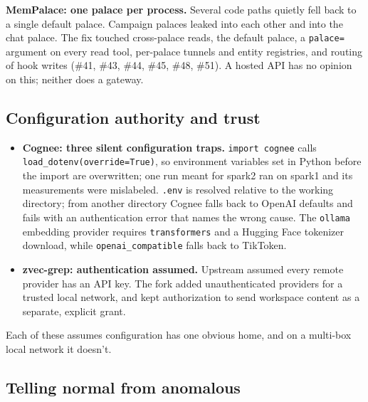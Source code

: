 \documentclass[11pt]{article}
\newcommand{\code}[1]{\texttt{#1}}
\begin{document}
\textbf{MemPalace: one palace per process.} Several code paths quietly fell back to a single default
palace. Campaign palaces leaked into each other and into the chat palace. The fix touched
cross-palace reads, the default palace, a \code{palace=} argument on every read tool, per-palace
tunnels and entity registries, and routing of hook writes (\#41, \#43, \#44, \#45, \#48, \#51). A
hosted API has no opinion on this; neither does a gateway.

\subsection{Configuration authority and trust}

\begin{itemize}
  \item \textbf{Cognee: three silent configuration traps.} \code{import cognee} calls
    \code{load\_dotenv(\allowbreak override=True)}, so environment variables set in Python before the import are
    overwritten; one run meant for spark2 ran on spark1 and its measurements were mislabeled.
    \code{.env} is resolved relative to the working directory; from another directory Cognee falls
    back to OpenAI defaults and fails with an authentication error that names the wrong cause. The
    \code{ollama} embedding provider requires \code{transformers} and a Hugging Face tokenizer
    download, while \code{openai\_compatible} falls back to TikToken.
  \item \textbf{zvec-grep: authentication assumed.} Upstream assumed every remote provider has an API
    key. The fork added unauthenticated providers for a trusted local network, and kept
    authorization to send workspace content as a separate, explicit grant.
\end{itemize}
Each of these assumes configuration has one obvious home, and on a multi-box local network it
doesn't.

\subsection{Telling normal from anomalous}
\end{document}
